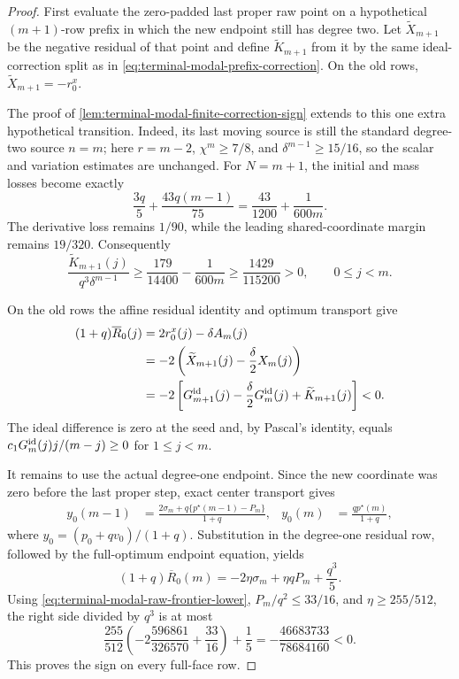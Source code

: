 \begin{proof}
First evaluate the zero-padded last proper raw point on a hypothetical
$(m+1)$-row prefix in which the new endpoint still has degree two.  Let
$\widetilde X_{m+1}$ be the negative residual of that point and define
$\widetilde K_{m+1}$ from it by the same ideal-correction split as in
\eqref{eq:terminal-modal-prefix-correction}.  On the old rows,
$\widetilde X_{m+1}=-r_0^x$.

The proof of \cref{lem:terminal-modal-finite-correction-sign} extends to this
one extra hypothetical transition.  Indeed, its last moving source is still
the standard degree-two source $n=m$; here $r=m-2$, $\chi^m\ge7/8$, and
$\delta^{m-1}\ge15/16$, so the scalar and variation estimates are unchanged.
For $N=m+1$, the initial and mass losses become exactly
\[
 \frac{3q}{5}+\frac{43q(m-1)}{75}
 =\frac{43}{1200}+\frac{1}{600m}.
\]
The derivative loss remains $1/90$, while the leading shared-coordinate
margin remains $19/320$.  Consequently
\begin{equation}
 \frac{\widetilde K_{m+1}(j)}{q^3\delta^{m-1}}
 \ge\frac{179}{14400}-\frac{1}{600m}
 \ge\frac{1429}{115200}>0,
 \qquad 0\le j<m.
 \label{eq:terminal-modal-hypothetical-final-correction}
\end{equation}

On the old rows the affine residual identity and optimum transport give
\begin{align}
 (1+q)\overline R_0(j)
 &=2r_0^x(j)-\delta A_m(j)\notag\\
 &=-2\left(\widetilde X_{m+1}(j)-\frac\delta2X_m(j)\right)\notag\\
 &=-2\left[
  G_{m+1}^{\rm id}(j)-\frac\delta2G_m^{\rm id}(j)
  +\widetilde K_{m+1}(j)
 \right]<0.
 \label{eq:terminal-modal-first-full-old-rows}
\end{align}
The ideal difference is zero at the seed and, by Pascal's identity, equals
$c_1G_m^{\rm id}(j)j/(m-j)\ge0$ for $1\le j<m$.

It remains to use the actual degree-one endpoint.  Since the new coordinate
was zero before the last proper step, exact center transport gives
\begin{align}
 y_0(m-1)&=
 \frac{2\sigma_m+q\{p^\star(m-1)-P_m\}}{1+q},
 &y_0(m)&=\frac{qp^\star(m)}{1+q},
 \label{eq:terminal-modal-first-full-endpoint-average}
\end{align}
where $y_0=(p_0+qv_0)/(1+q)$.  Substitution in the degree-one residual row,
followed by the full-optimum endpoint equation, yields
\begin{equation}
 (1+q)\overline R_0(m)
 =-2\eta\sigma_m+\eta qP_m+\frac{q^3}{5}.
 \label{eq:terminal-modal-first-full-endpoint-residual}
\end{equation}
Using \eqref{eq:terminal-modal-raw-frontier-lower},
$P_m/q^2\le33/16$, and $\eta\ge255/512$, the right side divided by $q^3$
is at most
\begin{equation}
 \frac{255}{512}\left(-2\frac{596861}{326570}+\frac{33}{16}\right)
 +\frac15
 =-\frac{46683733}{78684160}<0.
 \label{eq:terminal-modal-first-full-endpoint-margin}
\end{equation}
This proves the sign on every full-face row.
\end{proof}

